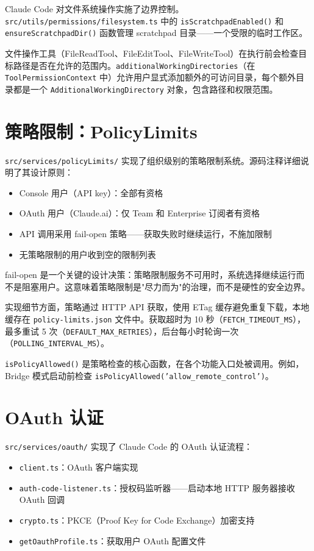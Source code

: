 Claude Code 对文件系统操作实施了边界控制。\texttt{src/utils/permissions/filesystem.ts} 中的 \texttt{isScratchpadEnabled()} 和 \texttt{ensureScratchpadDir()} 函数管理 scratchpad 目录——一个受限的临时工作区。

文件操作工具（FileReadTool、FileEditTool、FileWriteTool）在执行前会检查目标路径是否在允许的范围内。\texttt{additionalWorkingDirectories}（在 \texttt{ToolPermissionContext} 中）允许用户显式添加额外的可访问目录，每个额外目录都是一个 \texttt{AdditionalWorkingDirectory} 对象，包含路径和权限范围。

\section{策略限制：PolicyLimits}

\texttt{src/services/policyLimits/} 实现了组织级别的策略限制系统。源码注释详细说明了其设计原则：

\begin{itemize}
  \item Console 用户（API key）：全部有资格
  \item OAuth 用户（Claude.ai）：仅 Team 和 Enterprise 订阅者有资格
  \item API 调用采用 fail-open 策略——获取失败时继续运行，不施加限制
  \item 无策略限制的用户收到空的限制列表
\end{itemize}

fail-open 是一个关键的设计决策：策略限制服务不可用时，系统选择继续运行而不是阻塞用户。这意味着策略限制是"尽力而为"的治理，而不是硬性的安全边界。

实现细节方面，策略通过 HTTP API 获取，使用 ETag 缓存避免重复下载，本地缓存在 \texttt{policy-limits.json} 文件中。获取超时为 10 秒（\texttt{FETCH\_TIMEOUT\_MS}），最多重试 5 次（\texttt{DEFAULT\_MAX\_RETRIES}），后台每小时轮询一次（\texttt{POLLING\_INTERVAL\_MS}）。

\texttt{isPolicyAllowed()} 是策略检查的核心函数，在各个功能入口处被调用。例如，Bridge 模式启动前检查 \texttt{isPolicyAllowed('allow\_remote\_control')}。

\section{OAuth 认证}

\texttt{src/services/oauth/} 实现了 Claude Code 的 OAuth 认证流程：

\begin{itemize}
  \item \texttt{client.ts}：OAuth 客户端实现
  \item \texttt{auth-code-listener.ts}：授权码监听器——启动本地 HTTP 服务器接收 OAuth 回调
  \item \texttt{crypto.ts}：PKCE（Proof Key for Code Exchange）加密支持
  \item \texttt{getOauthProfile.ts}：获取用户 OAuth 配置文件
\end{itemize}

